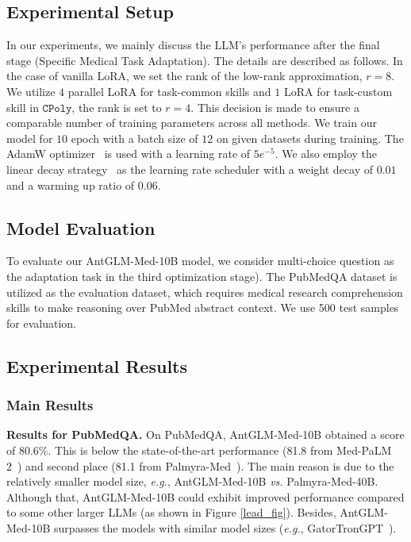 \documentclass{article} %
\begin{document}
\subsection{Experimental Setup}
In our experiments, we mainly discuss the LLM's performance after the final stage (Specific Medical Task Adaptation). The details are described as follows. In the case of vanilla LoRA, we set the rank of the low-rank approximation, $r=8$. We utilize $4$ parallel LoRA for task-common skills and $1$ LoRA for task-custom skill in $\texttt{CPoly}$, the rank is set to $r=4$. This decision is made to ensure a comparable number of training parameters across all methods. We train our model for $10$ epoch with a batch size of $12$ on given datasets during training. The AdamW optimizer~\citep{loshchilov2017decoupled} is used with a learning rate of $5e^{-5}$. We also employ the linear decay strategy~\citep{loshchilov2016sgdr} as the learning rate scheduler with a weight decay of $0.01$ and a warming up ratio of $0.06$. 


\subsection{Model Evaluation}
To evaluate our AntGLM-Med-10B model, we consider multi-choice question as the adaptation task in the third optimization stage). The PubMedQA dataset is utilized as the evaluation dataset, which requires medical research comprehension skills to make reasoning over PubMed abstract context. We use 500 test samples for evaluation.


\subsection{Experimental Results}
\subsubsection{Main Results}
\textbf{Results for PubMedQA.} On PubMedQA, AntGLM-Med-10B obtained a score of 80.6\%. This is below the state-of-the-art performance (81.8 from Med-PaLM 2~\citep{singhal2023expertlevel}) and second place (81.1 from Palmyra-Med~\citep{kamble2023palmyra}). The main reason is due to the relatively smaller model size, \textit{e.g.}, AntGLM-Med-10B \textit{vs.} Palmyra-Med-40B. Although that, AntGLM-Med-10B could exhibit improved performance compared to some other larger LLMs (as shown in Figure \ref{lead_fig}). Besides, AntGLM-Med-10B surpasses the models with similar model sizes (\textit{e.g.}, GatorTronGPT~\citep{peng2023study}).
\end{document}

